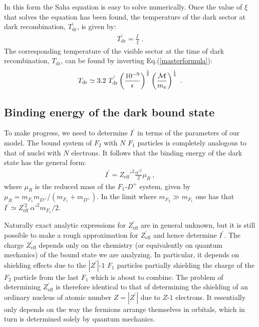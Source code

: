 \documentclass[12pt]{article}
\begin{document}
%
In this form the Saha equation is easy to solve numerically. Once  the
value of $\xi$ that solves the equation has been found, the temperature
of the dark sector at dark recombination, $T _{\text{dr}} ^{'}$, is
given by:
%
\begin{eqnarray}
T _{\text{dr}} ^{'} = \frac{I ^{'}}{\xi} \ .
\label{tdark}
\end{eqnarray}
%
The corresponding temperature of the visible sector at the time of dark
recombination, $T _{\text{dr}}$, can be found by inverting
Eq.(\ref{masterformula}):
%
\begin{eqnarray}
T _{\text{dr}} \simeq 3.2 \ T _{\text{dr}} ^{'} \left ( \frac{10
^{-9}}{\epsilon} \right ) ^{\frac{1}{2}} \left ( \frac{{\cal M}}{m _e}
\right ) ^{\frac{1}{4}} \ .
\label{darkord}
\end{eqnarray}
%
\subsection{Binding energy of the dark bound state}

To make progress, we need to determine $I ^{'}$ in terms of the
parameters of our model. The bound system of $F _2$ with $N$ $F _1$
particles is completely analogous to that of nuclei with $N$ electrons.
It follows that the binding energy of the dark state has the general
form:
%
\begin{eqnarray}
I ^{'} = {Z _{\text{eff}}'} ^2 \frac{\alpha '^{2}}{2} \mu _R \ ,
\label{ip}
\end{eqnarray} 
%
where $\mu _R$ is the reduced mass of the $F_1$-$D ^+$ system, given by
$\mu _R = m _{F_1}m _{D ^+}/(m _{F_1} + m _{D ^+})$. In the limit where
$m _{F_2} \gg m _{F_1}$ one has that $I ^{'} \simeq Z _{\text{eff}}
^{'2} \ {\alpha '} ^2 m _{F_1}/2$.

Naturally exact analytic expressions for $Z _{\text{eff}} ^{'}$ are in
general unknown, but it is still possible to make a rough approximation
for $Z ^{'} _{\text{eff}}$ and hence determine $I ^{'}$. The charge $Z
_{\text{eff}} ^{'}$ depends only on the chemistry (or equivalently on
quantum mechanics) of the bound state we are analyzing. In particular,
it depends on shielding effects due to the $|Z ^{'}|$-$1$ $F _1$
particles partially shielding the charge of the $F _2$ particle from the
last $F _1$ which is about to combine. The problem of determining $Z
_{\text{eff}} ^{'}$ is therefore identical to that of determining the
shielding of an ordinary nucleus of atomic number $Z = |Z ^{'}|$ due to
$Z$-$1$ electrons. It essentially only depends on the way the fermions
arrange themselves in orbitals, which in turn is determined solely by
quantum mechanics.
\end{document}
